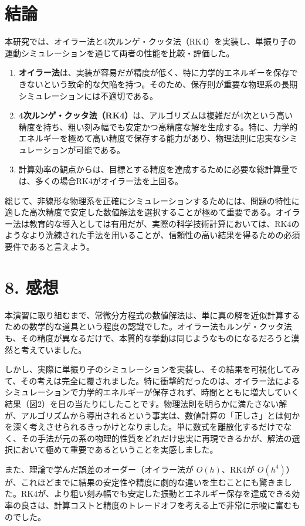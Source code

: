 \documentclass{article}
\begin{document}
\section{結論}
本研究では、オイラー法と4次ルンゲ・クッタ法（RK4）を実装し、単振り子の運動シミュレーションを通じて両者の性能を比較・評価した。
\begin{enumerate}
    \item \textbf{オイラー法}は、実装が容易だが精度が低く、特に力学的エネルギーを保存できないという致命的な欠陥を持つ。そのため、保存則が重要な物理系の長期シミュレーションには不適切である。
    \item \textbf{4次ルンゲ・クッタ法（RK4）}は、アルゴリズムは複雑だが4次という高い精度を持ち、粗い刻み幅でも安定かつ高精度な解を生成する。特に、力学的エネルギーを極めて高い精度で保存する能力があり、物理法則に忠実なシミュレーションが可能である。
    \item 計算効率の観点からは、目標とする精度を達成するために必要な総計算量では、多くの場合RK4がオイラー法を上回る。
\end{enumerate}
総じて、非線形な物理系を正確にシミュレーションするためには、問題の特性に適した高次精度で安定した数値解法を選択することが極めて重要である。オイラー法は教育的な導入としては有用だが、実際の科学技術計算においては、RK4のようなより洗練された手法を用いることが、信頼性の高い結果を得るための必須要件であると言えよう。
\section*{8. 感想}

本演習に取り組むまで、常微分方程式の数値解法は、単に真の解を近似計算するための数学的な道具という程度の認識でした。オイラー法もルンゲ・クッタ法も、その精度が異なるだけで、本質的な挙動は同じようなものになるだろうと漠然と考えていました。

しかし、実際に単振り子のシミュレーションを実装し、その結果を可視化してみて、その考えは完全に覆されました。特に衝撃的だったのは、オイラー法によるシミュレーションで力学的エネルギーが保存されず、時間とともに増大していく結果（図2）を目の当たりにしたことです。物理法則を明らかに満たさない解が、アルゴリズムから導出されるという事実は、数値計算の「正しさ」とは何かを深く考えさせられるきっかけとなりました。単に数式を離散化するだけでなく、その手法が元の系の物理的性質をどれだけ忠実に再現できるかが、解法の選択において極めて重要であるということを実感しました。

また、理論で学んだ誤差のオーダー（オイラー法が $O(h)$、RK4が $O(h^4)$） が、これほどまでに結果の安定性や精度に劇的な違いを生むことにも驚きました。RK4が、より粗い刻み幅でも安定した振動とエネルギー保存を達成できる効率の良さは、計算コストと精度のトレードオフを考える上で非常に示唆に富むものでした。
\end{document}
